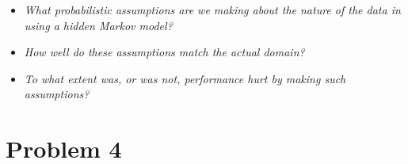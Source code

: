 \documentclass{article}
\begin{document}
\begin{enumerate}[(a)]
\begin{enumerate}
    \begin{itemize}
    \item \emph{What probabilistic assumptions are we making about the nature of
      the data in using a hidden Markov model?}

    \item \emph{How well do these assumptions match the actual domain?}

    \item \emph{To what extent was, or was not, performance hurt by making such
      assumptions?}

    \end{itemize}
  \end{enumerate}
\end{enumerate}
\section*{Problem 4}
\end{document}
